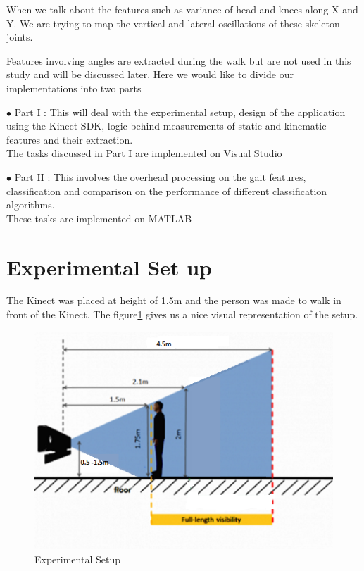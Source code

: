 \newpage
\noindent When we talk about the features such as variance of head and knees along X and Y. We are trying to map the vertical and lateral oscillations of these skeleton joints.

\noindent Features involving angles are extracted during the walk but are not used in this study and will be discussed later. Here we would like to divide our implementations into two parts

\noindent$\bullet$ Part I  : This will deal with the experimental setup, design of the application using the Kinect SDK, logic behind measurements of static and kinematic features and their extraction.\\
The tasks discussed in Part I are implemented on Visual Studio

\noindent$\bullet$ Part II  : This involves the overhead processing on the gait features, classification and comparison on the performance of different classification algorithms.\\
These tasks are implemented on MATLAB

\newpage
\section{Experimental Set up } \label{Experimental Set up }

\noindent The Kinect was placed at height of 1.5m and the person was made to walk in front of the Kinect. The figure\ref{fig:exp.png} gives us a nice visual  representation of the setup.\\
\begin{figure}[h]
\centering
\includegraphics[scale=0.8]{exp.png}
\caption{Experimental Setup}
\label{fig:exp.png}
\end{figure}

